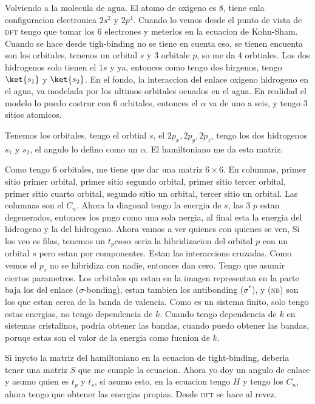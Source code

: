\documentclass[11pt,fleqn]{book}
\begin{document}
Volviendo a la molecula de agua. El atomo de oxigeno es $8$, tiene enla configuracion electronica $2s^{2}$ y $2p^{4}$. Cuando lo vemos desde el punto de vista de \textsc{dft} tengo que tomar los 6 electrones y meterlos en la ecuacion de Kohn-Sham. Cuando se hace desde tigh-binding no se tiene en cuenta eso, se tienen encuenta son los orbitales, tenenos un orbital $s$ y 3 orbitale $p$, so me da 4 orbtiales. Los dos hidrogenos solo tienen el $1s$ y ya, entonces como tengo dos hirgenos, tengo $\ket{s_{1}}$ y $\ket{s_{2}}$. En el fondo, la interaccion del enlace oxigeno hidrogeno en el agua, va modelada por los ultimos orbitales ocuados en el agua. En realidad el modelo lo puedo costrur con 6 orbitales, entonces el $\alpha$ va de uno a seis, y tengo 3 sitios atomicos. 



Tenemos  los orbitales, tengo el orbtial $s$, el $2p_{x},2p_{y},2p_{z}$, tengo los dos hidrogenos $s_{1}$ y $s_{2}$, el angulo lo defino como un $\alpha$. El hamiltoniano me da esta matriz:


Como tengo 6 orbitales, me tiene que dar una matriz $6\times6$. En columnas, primer sitio primer orbital, primer sitio segundo orbital, primer sitio tercer orbital, primer sitio cuarto orbital, segundo sitio un orbital, tercer sitio un orbital. Las columnas son el $C_{n}$. Ahora la diagonal tengo la energia de $s$, las 3 $p$ estan degenerados, entonces los pngo como una sola nergia, al final esta la energia del hidrogeno y la del hidrogeno. Ahora vamos a ver quienes con quienes se ven, Si los veo es filas, tenemos un $t_{p}cos\alpha$ seria la hibridizacion del orbital $p$ con un orbital $s$ pero estan por componentes. Estan las interaccions cruzadas. Como vemos el $p_{z}$ no se hibridiza con nadie, entonces dan cero. Tengo que asumir ciertos parametros. Los orbitales qu estan en la imagen representan en la parte baja los del enlace ($\sigma$-bonding), estan tambien los antibonding ($\sigma^{\ast}$), y (\textsc{nb}) son los que estan cerca de la banda de valencia. Como es un sistema finito, solo tengo estas energias, no tengo dependencia de $k$. Cuando tengo dependencia de $k$ en sistemas cristalinos, podria obtener las bandas, cuando puedo obtener las bandas, poruqe estas son el valor de la energia como fucnion de $k$. 

Si inycto la matriz del hamiltoniano en la ecuacion de tight-binding, deberia tener una matriz $S$ que me cumple la ecuacion. Ahora yo doy un angulo de enlace y asumo quien es $t_{p}$ y $t_{s}$, si asumo esto, en la ecuacion tengo $H$ y tengo los $C_{n}$, ahora tengo que obtener las energias propias. Desde \textsc{dft} se hace al revez. 
\end{document}
